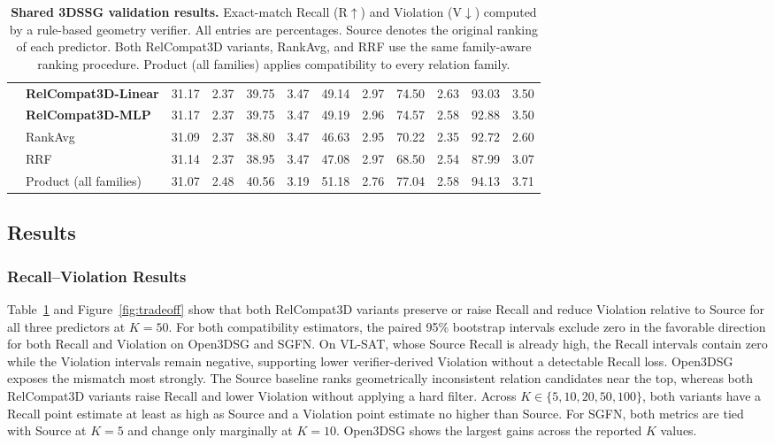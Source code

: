 \begin{table}[!t]
{\begin{tabular}{@{}llrrrrrrrrrr@{}}
    & \textbf{RelCompat3D-Linear} & 31.17 & 2.37 & 39.75 & 3.47 & 49.14 & 2.97 & 74.50 & 2.63 & 93.03 & 3.50 \\
    & \textbf{RelCompat3D-MLP} & 31.17 & 2.37 & 39.75 & 3.47 & 49.19 & 2.96 & 74.57 & 2.58 & 92.88 & 3.50 \\
    & RankAvg & 31.09 & 2.37 & 38.80 & 3.47 & 46.63 & 2.95 & 70.22 & 2.35 & 92.72 & 2.60 \\
    & RRF & 31.14 & 2.37 & 38.95 & 3.47 & 47.08 & 2.97 & 68.50 & 2.54 & 87.99 & 3.07 \\
    & Product (all families) & 31.07 & 2.48 & 40.56 & 3.19 & 51.18 & 2.76 & 77.04 & 2.58 & 94.13 & 3.71 \\
    \bottomrule
    \end{tabular}
    }
    \caption{\textbf{Shared 3DSSG validation results.} Exact-match Recall (R$\uparrow$) and Violation (V$\downarrow$) computed by a rule-based geometry verifier. All entries are percentages. Source denotes the original ranking of each predictor. Both RelCompat3D variants, RankAvg, and RRF use the same family-aware ranking procedure. Product (all families) applies compatibility to every relation family.}
    \label{tab:main-results}
\end{table}

\subsection{Results}
\subsubsection{Recall–Violation Results}
Table~\ref{tab:main-results} and Figure~\ref{fig:tradeoff} show that both RelCompat3D variants preserve or raise Recall and reduce Violation relative to Source for all three predictors at $K=50$. For both compatibility estimators, the paired 95\% bootstrap intervals exclude zero in the favorable direction for both Recall and Violation on Open3DSG and SGFN. On VL-SAT, whose Source Recall is already high, the Recall intervals contain zero while the Violation intervals remain negative, supporting lower verifier-derived Violation without a detectable Recall loss. Open3DSG exposes the mismatch most strongly. The Source baseline ranks geometrically inconsistent relation candidates near the top, whereas both RelCompat3D variants raise Recall and lower Violation without applying a hard filter. Across $K\in\{5,10,20,50,100\}$, both variants have a Recall point estimate at least as high as Source and a Violation point estimate no higher than Source. For SGFN, both metrics are tied with Source at $K=5$ and change only marginally at $K=10$. Open3DSG shows the largest gains across the reported $K$ values. 

